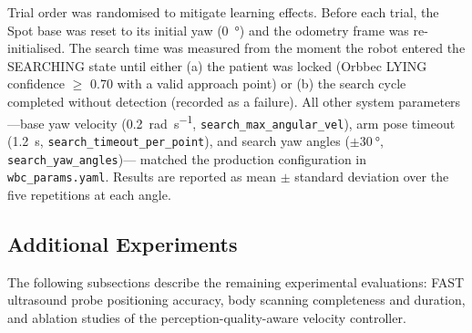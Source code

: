 Trial order was randomised to mitigate learning effects.  Before each trial,
the Spot base was reset to its initial yaw (\SI{0}{\degree}) and the
odometry frame was re-initialised.  The search time was measured from the
moment the robot entered the SEARCHING state until either (a) the patient
was locked (Orbbec LYING confidence $\geq$ \num{0.70} with a valid approach
point) or (b) the search cycle completed without detection (recorded as a
failure).  All other system parameters---base yaw velocity
(\SI{0.2}{\radian\per\second}, \texttt{search\_max\_angular\_vel}), arm pose
timeout (\SI{1.2}{\second}, \texttt{search\_timeout\_per\_point}), and
search yaw angles ($\pm\SI{30}{\degree}$, \texttt{search\_yaw\_angles})---
matched the production configuration in \texttt{wbc\_params.yaml}.
Results are reported as mean $\pm$ standard deviation over the five
repetitions at each angle.

\subsection{Additional Experiments}

The following subsections describe the remaining experimental evaluations:
\ac{FAST} ultrasound probe positioning accuracy, body scanning completeness
and duration, and ablation studies of the perception-quality-aware velocity
controller.
